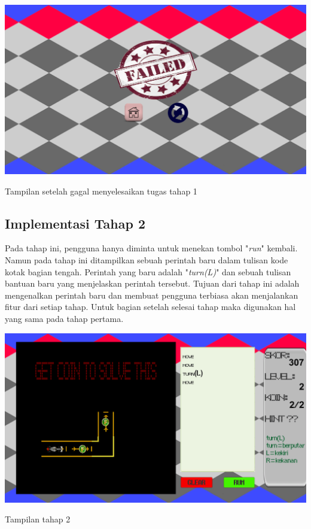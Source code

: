 	\begin{table}
		\centering
		\includegraphics[width=\linewidth-40pt]{pics/prototipe/ending2}
		\caption{Tampilan setelah gagal menyelesaikan tugas tahap 1}
	\end{table}
	\subsection{Implementasi Tahap 2}
	Pada tahap ini, pengguna hanya diminta untuk menekan tombol "\textit{run}" kembali. Namun pada tahap ini ditampilkan sebuah perintah baru dalam tulisan kode kotak bagian tengah. Perintah yang baru adalah "\textit{turn(L)}" dan sebuah tulisan bantuan baru yang menjelaskan perintah tersebut. Tujuan dari tahap ini adalah mengenalkan perintah baru dan membuat pengguna terbiasa akan menjalankan fitur dari setiap tahap. Untuk bagian setelah selesai tahap maka digunakan hal yang sama pada tahap pertama.
	\begin{table}
		\centering
		\includegraphics[width=\linewidth-40pt]{pics/prototipe/tahap2}
		\caption{Tampilan tahap 2}
	\end{table}
